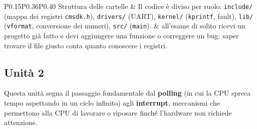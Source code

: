 {\begin{longtable}{P{0.15}P{0.36}P{0.40}}
        Struttura delle cartelle
        & Il codice è diviso per ruolo: \texttt{include/} (mappa dei registri \texttt{cmsdk.h}), \texttt{drivers/} (UART), \texttt{kernel/} (\texttt{kprintf}, fault), \texttt{lib/} (\texttt{vformat}, conversione dei numeri), \texttt{src/} (\texttt{main}).
        & \regl all'esame di solito ricevi un progetto già fatto e devi aggiungere una funzione o correggere un bug: saper trovare il file giusto conta quanto conoscere i registri.\\
\end{longtable}
}

\subsection{Unità 2}
Questa unità segna il passaggio fondamentale dal \textbf{polling} (in cui la CPU spreca tempo aspettando in un ciclo infinito) agli \textbf{interrupt}, meccanismi che permettono alla CPU di lavorare o riposare finché l'hardware non richiede attenzione.

